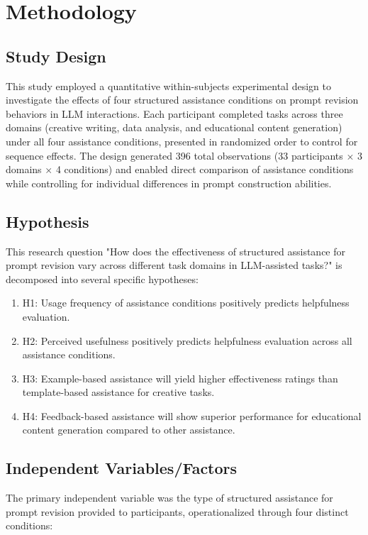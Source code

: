 \section{\textbf{Methodology}}

\subsection {\textbf {Study Design}}
This study employed a quantitative within-subjects experimental design to investigate the effects of four structured assistance conditions on prompt revision behaviors in LLM interactions. Each participant completed tasks across three domains (creative writing, data analysis, and educational content generation) under all four assistance conditions, presented in randomized order to control for sequence effects. The design generated 396 total observations (33 participants $\times$ 3 domains $\times$ 4 conditions) and enabled direct comparison of assistance conditions while controlling for individual differences in prompt construction abilities.

\subsection{\textbf{Hypothesis}}
This research question "How does the effectiveness of structured assistance for prompt revision vary across different task domains in LLM-assisted tasks?" is decomposed into several specific hypotheses:
\begin{enumerate}
    \item H1: Usage frequency of assistance conditions positively predicts helpfulness evaluation.
    \item H2: Perceived usefulness positively predicts helpfulness evaluation across all assistance conditions.
    \item H3: Example-based assistance will yield higher effectiveness ratings than template-based assistance for creative tasks.
    \item H4: Feedback-based assistance will show superior performance for educational content generation compared to other assistance.
\end{enumerate}


\subsection{\textbf{Independent Variables/Factors}}
The primary independent variable was the type of structured assistance for prompt revision provided to participants, operationalized through four distinct conditions:

